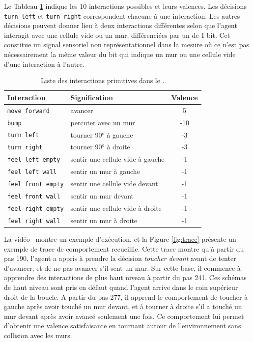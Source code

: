 Le Tableau \ref{tab:small_loop} indique les 10 interactions possibles et leurs valences. 
Les décisions \texttt{turn left} et \texttt{turn right} correspondent chacune à une interaction.
Les autres décisions peuvent donner lieu à deux interactions différentes selon que l'agent interagit avec une cellule vide ou un mur, différenciées par un  de 1 bit.
Cet  constitue un signal sensoriel non représentationnel dans la mesure où ce n'est pas nécessairement la même valeur du bit qui indique un mur ou une cellule vide d'une interaction à l'autre.


\begin{table}[h!]
	\centering
	\begin{tabular}{|l|l|c|}
		\hline
		\textbf{Interaction} & \textbf{Signification} & \textbf{Valence} \\ \hline
		\texttt{move forward} & avancer & 5 \\ \hline
		\texttt{bump} & percuter avec un mur & -10 \\ \hline
		\texttt{turn left} & tourner 90° à gauche & -3\\ \hline
		\texttt{turn right} & tourner 90° à droite & -3\\ \hline
		\texttt{feel left empty} & sentir une cellule vide à gauche & -1\\ \hline
		\texttt{feel left wall} & sentir un mur à gauche & -1\\ \hline
		\texttt{feel front empty} & sentir une cellule vide devant & -1\\ \hline
		\texttt{feel front wall} & sentir un mur devant & -1\\ \hline
		\texttt{feel right empty} & sentir une cellule vide à droite & -1\\ \hline
		\texttt{feel right wall} & sentir un mur à droite & -1\\ \hline
	\end{tabular}
	\caption{Liste des interactions primitives dans le .}
	\label{tab:small_loop}
\end{table}



La vidéo~ montre un exemple d'exécution,
et la Figure \ref{fig:trace} présente un exemple de trace de comportement recueillie.
Cette trace montre qu'à partir du pas 190, l'agent a appris à prendre la décision \emph{toucher devant} avant de tenter d'avancer, et de ne pas avancer s'il sent un mur.
Sur cette base, il commence à apprendre des interactions de plus haut niveau à partir du pas 241.
Ces schémas de haut niveau sont pris en défaut quand l'agent arrive dans le coin supérieur droit de la boucle. 
A partir du pas 277, il apprend le comportement de toucher à gauche après avoir touché un mur devant, et à tourner à droite s'il a touché un mur devant après avoir avancé seulement une fois. 
Ce comportement lui permet d'obtenir une valence satisfaisante en tournant autour de l'environnement sans collision avec les murs. 



